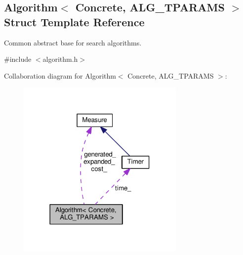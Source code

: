 \hypertarget{structAlgorithm}{}\subsection{Algorithm$<$ Concrete, A\+L\+G\+\_\+\+T\+P\+A\+R\+A\+MS $>$ Struct Template Reference}
\label{structAlgorithm}


Common abstract base for search algorithms.  




{\ttfamily \#include $<$algorithm.\+h$>$}



Collaboration diagram for Algorithm$<$ Concrete, A\+L\+G\+\_\+\+T\+P\+A\+R\+A\+MS $>$\+:\nopagebreak
\begin{figure}[H]
\begin{center}
\leavevmode
\includegraphics[width=231pt]{structAlgorithm__coll__graph}
\end{center}
\end{figure}
